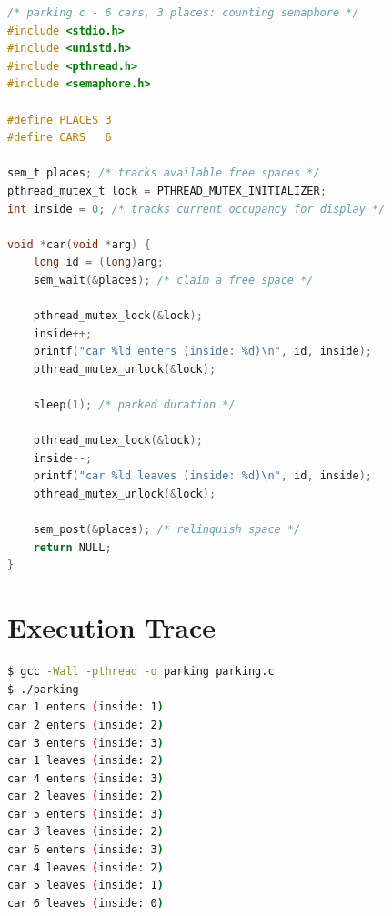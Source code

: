 \documentclass[12pt,a4paper]{report}
\numberwithin{equation}{chapter}
\numberwithin{figure}{chapter}
\numberwithin{table}{chapter}
\begin{document}
\begin{lstlisting}[language=C]
/* parking.c - 6 cars, 3 places: counting semaphore */
#include <stdio.h>
#include <unistd.h>
#include <pthread.h>
#include <semaphore.h>

#define PLACES 3
#define CARS   6

sem_t places; /* tracks available free spaces */
pthread_mutex_t lock = PTHREAD_MUTEX_INITIALIZER;
int inside = 0; /* tracks current occupancy for display */

void *car(void *arg) {
    long id = (long)arg;
    sem_wait(&places); /* claim a free space */

    pthread_mutex_lock(&lock);
    inside++;
    printf("car %ld enters (inside: %d)\n", id, inside);
    pthread_mutex_unlock(&lock);

    sleep(1); /* parked duration */

    pthread_mutex_lock(&lock);
    inside--;
    printf("car %ld leaves (inside: %d)\n", id, inside);
    pthread_mutex_unlock(&lock);

    sem_post(&places); /* relinquish space */
    return NULL;
}
\end{lstlisting}

\section{Execution Trace}
\begin{lstlisting}[language=bash]
$ gcc -Wall -pthread -o parking parking.c
$ ./parking
car 1 enters (inside: 1)
car 2 enters (inside: 2)
car 3 enters (inside: 3)
car 1 leaves (inside: 2)
car 4 enters (inside: 3)
car 2 leaves (inside: 2)
car 5 enters (inside: 3)
car 3 leaves (inside: 2)
car 6 enters (inside: 3)
car 4 leaves (inside: 2)
car 5 leaves (inside: 1)
car 6 leaves (inside: 0)
\end{lstlisting}
\end{document}
